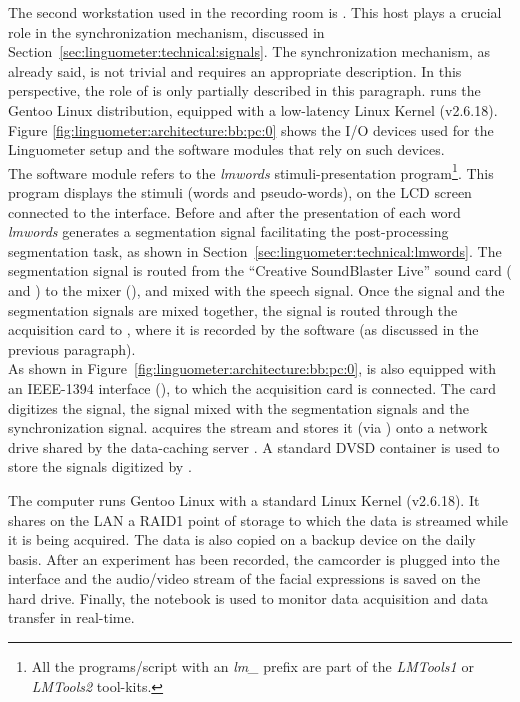 The second workstation used in the recording room is . 
This host plays a crucial role in the synchronization mechanism, discussed in
Section~\ref{sec:linguometer:technical:signals}.
The synchronization mechanism, as already said, is not trivial and requires an
appropriate description. 
In this perspective, the role of  is only partially described in this
paragraph.
 runs the Gentoo Linux distribution, equipped with a low-latency
Linux Kernel (v2.6.18).
Figure \ref{fig:linguometer:architecture:bb:pc:0} shows the I/O devices used for
the Linguometer setup and the software modules that rely on such devices.\\
The  software module refers to the \emph{lmwords}
stimuli-presentation program\footnote{All the programs/script with an
\emph{lm\_} prefix are part of the \emph{LMTools1} or \emph{LMTools2}
tool-kits.}. 
This program displays the stimuli (words and pseudo-words), on the LCD screen
connected to the  interface.
Before and after the presentation of each word \emph{lmwords} generates a 
segmentation signal facilitating the post-processing segmentation task, as
shown in Section~\ref{sec:linguometer:technical:lmwords}.
The segmentation signal is routed from the  ``Creative SoundBlaster 
Live'' sound card ( and ) to the mixer
(), and mixed with the  speech signal.
Once the  signal and the segmentation signals are mixed together, the
signal is routed through the acquisition card  to , where
it is  recorded by the  software (as discussed in the previous
paragraph).\\
As shown in Figure~\ref{fig:linguometer:architecture:bb:pc:0},  is also
equipped with an IEEE-1394 interface (), to which the 
 acquisition card is connected. 
The  card digitizes the  signal, the  signal
mixed with the segmentation signals and the  synchronization signal.
 acquires the stream and stores it (via ) onto a network
drive shared by the data-caching server .
A standard DVSD container is used to store the signals digitized by .

The  computer runs Gentoo Linux with a standard Linux Kernel (v2.6.18).
It shares on the  LAN a RAID1 point of storage to which the data is
streamed while it is being acquired.
The data is also copied on a backup device on the daily basis.
After an experiment has been recorded, the  camcorder is plugged into 
the   interface and the audio/video stream of the facial
expressions is saved on the hard drive.
Finally, the  notebook is used to monitor data acquisition and data 
transfer in real-time.
